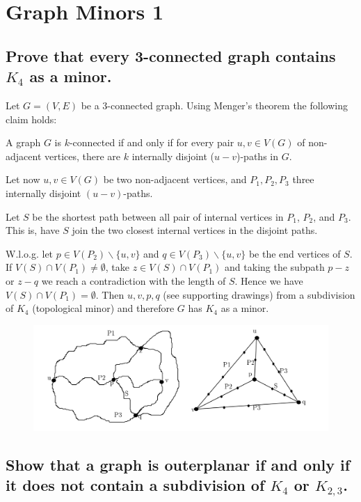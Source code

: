 \section{Graph Minors 1}

\subsection[Minors 1 - 1]{Prove that every 3-connected graph contains $K_4$ as a minor.}

Let $G = (V,E)$ be a 3-connected graph.
Using Menger's theorem the following claim holds:
\begin{claim}
    A graph $G$ is $k$-connected if and only if for every pair $u,v \in V(G)$ of non-adjacent vertices, there are $k$ internally disjoint ($u-v$)-paths in $G$.
\end{claim}
Let now $u,v \in V(G)$ be two non-adjacent vertices, and $P_1, P_2, P_3$ three internally disjoint $(u-v)$-paths.

Let $S$ be the shortest path between all pair of internal vertices in $P_1$, $P_2$, and $P_3$.
This is, have $S$ join the two closest internal vertices in the disjoint paths.

W.l.o.g. let $p \in V(P_2) \backslash \{u, v \}$ and $q \in V(P_3) \backslash \{ u, v\}$ be the end vertices of $S$.
If $V(S) \cap V(P_1) \neq \emptyset$, take $z \in V(S) \cap V(P_1)$ and taking the subpath $p-z$ or $z-q$ we reach a contradiction with the length of $S$.
Hence we have $V(S) \cap V(P_1) = \emptyset$.
Then $u,v,p,q$ (see supporting drawings) from a subdivision of $K_4$ (topological minor) and therefore $G$ has $K_4$ as a minor.
\begin{figure}[h!]
    \centering
    \includegraphics[width=\textwidth]{img/minors_1_1.png}
\end{figure}

\subsection[Minors 1 - 2]{Show that a graph is outerplanar if and only if it does not contain a subdivision of $K_4$ or $K_{2,3}$.}

